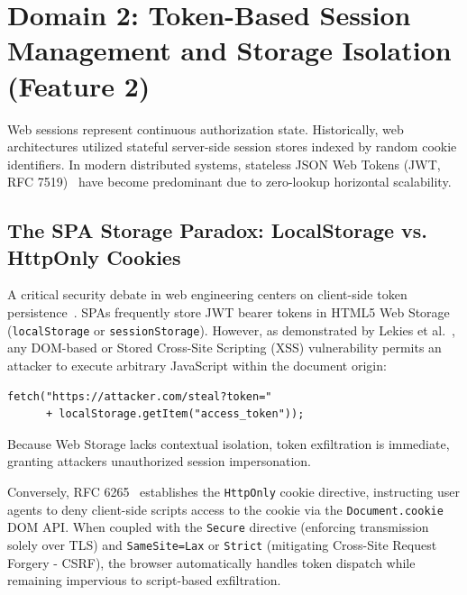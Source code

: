 \documentclass[10pt,twocolumn,a4paper]{article}
\begin{document}
\section{Domain 2: Token-Based Session Management and Storage Isolation (Feature 2)}
Web sessions represent continuous authorization state. Historically, web architectures utilized stateful server-side session stores indexed by random cookie identifiers. In modern distributed systems, stateless JSON Web Tokens (JWT, RFC 7519)~\cite{jones2015jwt} have become predominant due to zero-lookup horizontal scalability.

\subsection{The SPA Storage Paradox: LocalStorage vs. HttpOnly Cookies}
A critical security debate in web engineering centers on client-side token persistence~\cite{de2014security}. SPAs frequently store JWT bearer tokens in HTML5 Web Storage (\texttt{localStorage} or \texttt{sessionStorage}). However, as demonstrated by Lekies et al.~\cite{lekies2013domxss}, any DOM-based or Stored Cross-Site Scripting (XSS) vulnerability permits an attacker to execute arbitrary JavaScript within the document origin:
\begin{verbatim}
fetch("https://attacker.com/steal?token=" 
      + localStorage.getItem("access_token"));
\end{verbatim}
Because Web Storage lacks contextual isolation, token exfiltration is immediate, granting attackers unauthorized session impersonation.

Conversely, RFC 6265~\cite{barth2011cookie} establishes the \texttt{HttpOnly} cookie directive, instructing user agents to deny client-side scripts access to the cookie via the \texttt{Document.cookie} DOM API. When coupled with the \texttt{Secure} directive (enforcing transmission solely over TLS) and \texttt{SameSite=Lax} or \texttt{Strict} (mitigating Cross-Site Request Forgery - CSRF), the browser automatically handles token dispatch while remaining impervious to script-based exfiltration.
\end{document}
